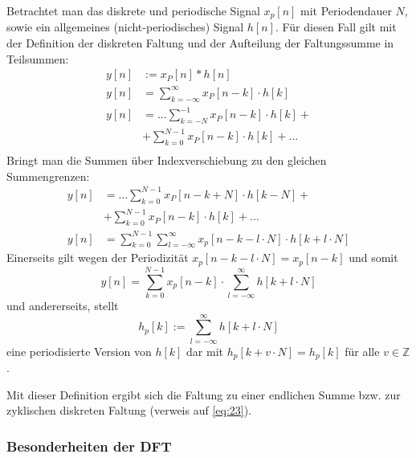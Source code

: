 \documentclass[12pt,a4paper]{scrartcl}
\begin{document}
    \noindent Betrachtet man das diskrete und periodische Signal $x_p[n]$ mit Periodendauer $N$, sowie ein allgemeines (nicht-periodisches) Signal $h[n]$. 
    Für diesen Fall gilt mit der Definition der diskreten Faltung und der Aufteilung der Faltungssumme in Teilsummen: 
    \begin{equation}
      \label{eq:24}
        \begin{split}
        y[n] &:= x_P[n] * h[n] \\
        y[n] &= \sum_{k=-\infty}^{\infty} x_P[n-k] \cdot h[k] \\
        y[n] &= ... \sum_{k=-N}^{-1} x_P[n-k] \cdot h[k] +\\
        &+ \sum_{k=0}^{N-1} x_P[n-k] \cdot h[k] + ...\\
        \end{split}
      \end{equation}
      \noindent Bringt man die Summen über Indexverschiebung zu den gleichen Summengrenzen:
      \begin{equation}
        \label{eq:25}
          \begin{split}
          y[n] &= ... \sum_{k=0}^{N-1} x_P[n-k + N] \cdot h[k - N] + \\
          &  +  \sum_{k=0}^{N-1} x_P[n-k] \cdot h[k] + ...\\
          y[n] &= \sum_{k=0}^{N-1} \sum_{l = -\infty}^{\infty} x_p [n -k -l \cdot N] \cdot h[k + l\cdot N]
          \end{split}
        \end{equation}
\noindent Einerseits gilt wegen der Periodizität $x_p[n-k -l\cdot N] = x_p[n-k]$ und somit
$$y[n] = \sum_{k=0}^{N-1} x_p[n-k]\cdot \sum_{l=-\infty}^{\infty} h[k + l\cdot N]$$
und andererseits, stellt 
$$h_p [k] := \sum_{l=-\infty}^{\infty} h[k + l\cdot N]$$
eine periodisierte Version von $h[k]$ dar mit $h_p[k + v\cdot N] = h_p[k]$ für alle $v \in \mathbb{Z}$.

\noindent Mit dieser Definition ergibt sich die Faltung zu einer endlichen Summe bzw. zur zyklischen diskreten Faltung (verweis auf \ref{eq:23}).

\subsubsection{Besonderheiten der DFT}
  \label{sec:sub:sub:besonderheiten-dft}
\end{document}
